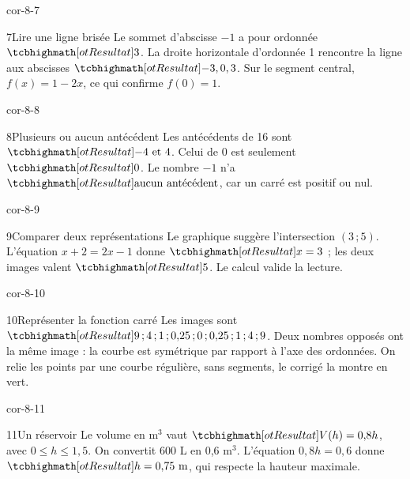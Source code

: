 \begin{blocLivre}{cor-8-7}\begin{corrige}{7}{Lire une ligne brisée}
Le sommet d’abscisse $-1$ a pour ordonnée $\res3$. La droite horizontale d’ordonnée 1 rencontre la ligne aux abscisses $\res{-3,0,3}$. Sur le segment central, $f(x)=1-2x$, ce qui confirme $f(0)=1$.
\label{fig-cor-8-7}
\end{corrige}\end{blocLivre}
\begin{blocLivre}{cor-8-8}\begin{corrige}{8}{Plusieurs ou aucun antécédent}
Les antécédents de 16 sont $\res{-4\text{ et }4}$. Celui de 0 est seulement $\res0$. Le nombre $-1$ n’a $\res{\text{aucun antécédent}}$, car un carré est positif ou nul.
\label{fig-cor-8-8}
\end{corrige}\end{blocLivre}
\begin{blocLivre}{cor-8-9}\begin{corrige}{9}{Comparer deux représentations}
Le graphique suggère l’intersection $(3\,;5)$. L’équation $x+2=2x-1$ donne $\res{x=3}$ ; les deux images valent $\res5$. Le calcul valide la lecture.
\label{fig-cor-8-9}
\end{corrige}\end{blocLivre}
\begin{blocLivre}{cor-8-10}\begin{corrige}{10}{Représenter la fonction carré}
Les images sont $\res{9\,;4\,;1\,;0{,}25\,;0\,;0{,}25\,;1\,;4\,;9}$. Deux nombres opposés ont la même image : la courbe est symétrique par rapport à l’axe des ordonnées. On relie les points par une courbe régulière, sans segments, le corrigé la montre en vert.
\label{fig-cor-8-10}
\end{corrige}\end{blocLivre}
\begin{blocLivre}{cor-8-11}\begin{corrige}{11}{Un réservoir}
Le volume en m$^3$ vaut $\res{V(h)=0{,}8h}$, avec $0\le h\le1{,}5$. On convertit 600 L en 0,6 m$^3$. L’équation $0{,}8h=0{,}6$ donne $\res{h=0{,}75\text{ m}}$, qui respecte la hauteur maximale.
\label{fig-cor-8-11}
\end{corrige}\end{blocLivre}
